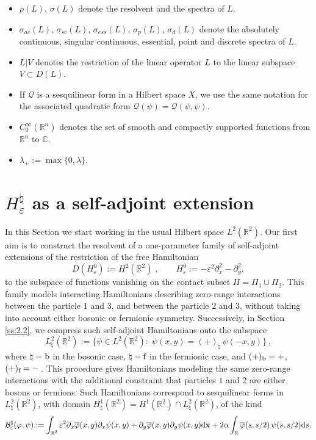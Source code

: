 \documentclass[a4paper,11pt,reqno]{amsart}
\theoremstyle{definition}
\numberwithin{equation}{section}
\newcommand{\CO}{\mathbb C}
\newcommand{\RE}{\mathbb R}
\newcommand{\BB}{\mathcal B}
\newcommand{\ve}{\varepsilon}
\renewcommand{\d}{\mathrm{d}}
\newcommand{\x}{{\bf  x}}
\newcommand{\bos}{\text{\rm b}}
\newcommand{\fer}{\text{\rm f}}
\newcommand{\bosfer}{{\natural}}
\begin{document}
\begin{itemize}
\item[-] $\rho(L)$, $\sigma(L)$ denote the resolvent and the spectra of $L$. 
\item[-] $\sigma_{ac}(L)$, $\sigma_{sc}(L)$, $\sigma_{ess}(L)$, $\sigma_{p}(L)$, $\sigma_{d}(L)$ denote the absolutely continuous, singular continuous, essential, point and discrete spectra of $L$.
\item[-] $L|V$ denotes the restriction of the linear operator $L$ to the linear subspace $V\subset D(L)$.
\item[-] If $\mathcal Q$ is a sesquilinear form in a Hilbert space $X$, we use the same notation for the associated quadratic form $\mathcal Q(\psi) = \mathcal Q(\psi,\psi)$.  
\item[-] $C^{\infty}_{0}(\RE^n)$ denotes the set of smooth and compactly supported functions from $\RE^n$ to $\CO$. %
\item[-] $\lambda_{+}:=\max\{0,\lambda\}$.
\end{itemize}





\section{ $H^\bosfer_\ve$ as a self-adjoint extension}\label{s:Hamiltonian}
In this Section we start working in the usual Hilbert space $L^2(\RE^2)$. 
Our first aim is to construct the resolvent of a one-parameter  family of self-adjoint extensions of the restriction of the free Hamiltonian 
\[
D(H^{0}_{\ve}) := H^2(\RE^2)\;,\qquad
H^{0}_{\ve} :=-\ve^2 \partial^2_{x}-\partial^2_{y} , 
\]
to the subspace of functions vanishing on the  contact subset $\Pi= \Pi_1\cup \Pi_2$.  This family models interacting Hamiltonians describing zero-range interactions  between the particle $1$ and $3$, and between the particle $2$ and $3$, without taking into account either bosonic or fermionic symmetry. Successively, in Section \ref{ss:2.2},  we compress such self-adjoint Hamiltonians onto the subspace 
\[
L^2_{\bosfer}(\RE^2) := \{\psi\in L^2(\RE^2):\; \psi(x,y) =(+)_{\bosfer} \,\psi(-x,y) \}\,,
\]
where 
$\bosfer={\bos}$ in the bosonic case,  $\bosfer={\fer}$ in the fermionic case, and $(+)_{\bos}=+$, $(+)_{\fer}=-\,$. 
This procedure gives  Hamiltonians modeling the same zero-range interactions with the additional constraint that 
particles $1$ and $2$ are either bosons or fermions. Such Hamiltonians correspond to sesquilinear forms in $L^{2}_{\bosfer}(\RE^{2})$, with domain $H^{1}_{\bosfer}(\RE^{2})=H^{1}(\RE^{2})\cap L^{2}_{\bosfer}(\RE^{2})$, of the kind 
\begin{equation*}%
\BB^\bosfer_{\ve}(\varphi, \psi):= \int_{\RE^2} \ve^2 {\partial_x \overline\varphi(x,y)}\partial_x \psi(x,y) + {\partial_y \overline\varphi(x,y)} \partial_y \psi(x,y) \d\x +2 \alpha
 \int_{\RE}  {\overline\varphi(s,s/2)} \, \psi(s,s/2)  \d s.
\end{equation*}
\end{document}

